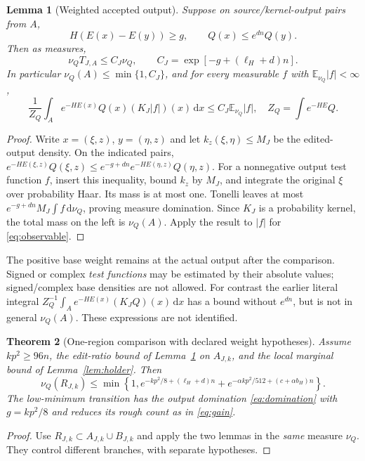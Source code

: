 \documentclass[11pt]{article}
\newtheorem{theorem}{Theorem}[section]
\newtheorem{lemma}[theorem]{Lemma}
\theoremstyle{definition}
\theoremstyle{remark}
\newcommand{\E}{\mathbb E}
\newcommand{\dd}{\,\mathrm d}
\begin{document}
\begin{lemma}[Weighted accepted output]\label{lem:domination}
Suppose on source/kernel-output pairs from $A$,
\[
 H(E(x)-E(y))\ge g,\qquad Q(x)\le e^{d n}Q(y).
\]
Then as measures,
\begin{equation}
 \nu_Q T_{J,A}\le C_J\nu_Q,\qquad
 C_J=\exp[-g+(\ell_H+d)n].
 \label{eq:domination}
\end{equation}
In particular $\nu_Q(A)\le\min\{1,C_J\}$, and for every measurable $f$
with $\E_{\nu_Q}|f|<\infty$,
\begin{equation}
 \frac1{Z_Q}\int_A e^{-HE(x)}Q(x)(K_J|f|)(x)\dd x
 \le C_J\E_{\nu_Q}|f|,
 \quad Z_Q=\int e^{-HE}Q.
 \label{eq:observable}
\end{equation}
\end{lemma}
\begin{proof}
Write $x=(\xi,z)$, $y=(\eta,z)$ and let $k_z(\xi,\eta)\le M_J$ be
the edited-output density. On the indicated pairs,
$e^{-HE(\xi,z)}Q(\xi,z)\le e^{-g+dn}e^{-HE(\eta,z)}Q(\eta,z)$.
For a nonnegative output test function $f$, insert this inequality, bound
$k_z$ by $M_J$, and integrate the original $\xi$ over probability Haar.
Its mass is at most one. Tonelli leaves at most
$e^{-g+dn}M_J\int f\dd\nu_Q$, proving measure domination. Since $K_J$
is a probability kernel, the total mass on the left is $\nu_Q(A)$.
Apply the result to $|f|$ for \eqref{eq:observable}.
\end{proof}
The positive base weight remains at the actual output after the
comparison. Signed or complex \emph{test functions} may be estimated by
their absolute values; signed/complex base densities are not allowed.
For contrast the earlier literal integral
$Z_Q^{-1}\int_Ae^{-HE(x)}(K_JQ)(x)\dd x$ has a bound without $e^{dn}$,
but is not in general $\nu_Q(A)$. These expressions are not identified.

\begin{theorem}[One-region comparison with declared weight hypotheses]
\label{thm:general}
Assume $kp^2\ge96n$, the edit-ratio bound of
Lemma~\ref{lem:domination} on $A_{J,k}$, and the local marginal bound of
Lemma~\ref{lem:holder}. Then
\begin{equation}
 \nu_Q(R_{J,k})\le\min\left\{1,
 e^{-kp^2/8+(\ell_H+d)n}
 +e^{-\alpha kp^2/512+(c+\alpha b_H)n}\right\}.
 \label{eq:general}
\end{equation}
The low-minimum transition has the output domination
\eqref{eq:domination} with $g=kp^2/8$ and reduces its rough count as in
\eqref{eq:gain}.
\end{theorem}
\begin{proof}
Use $R_{J,k}\subset A_{J,k}\cup B_{J,k}$ and apply the two lemmas in the
\emph{same} measure $\nu_Q$. They control different branches, with
separate hypotheses.
\end{proof}
\end{document}
